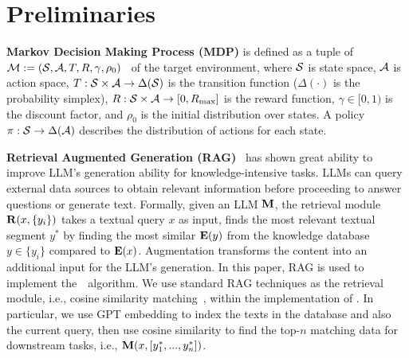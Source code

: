 
\vspace{-1mm}
\section{Preliminaries}
\vspace{-2mm}

\textbf{Markov Decision Making Process (MDP)} is defined as a tuple of ${\mathcal{M}}:=({\mathcal{S}}, {\mathcal{A}}, T, R, \gamma, \rho_0)$~\citep{rl@2018sutton} of the target environment, where ${\mathcal{S}}$ is state space, ${\mathcal{A}}$ is action space, $T:{\mathcal{S}}\times {\mathcal{A}}\to \Delta({\mathcal{S}})$ is the transition function ($\Delta(\cdot)$ is the probability simplex), $R:{\mathcal{S}}\times {\mathcal{A}}\to [0, R_{\max} ]$ is the reward function, $\gamma\in [0,1)$ is the discount factor, and $\rho_0$ is the initial distribution over states. A policy $\pi:{\mathcal{S}}\to \Delta({\mathcal{A}})$ describes the distribution of actions for each state. 

\textbf{Retrieval Augmented Generation (RAG)}~\citep{rag@2020patick} has shown great ability to improve LLM's generation ability for knowledge-intensive tasks. LLMs can query external data sources to obtain relevant information before proceeding to answer questions or generate text. Formally, given an LLM $\mathbf{M}$, the retrieval module $\mathbf{R}(x, \{y_i\})$ takes a textual query $x$ as input, finds the most relevant textual segment $y^*$ by finding the most similar $\mathbf{E}(y)$ from the knowledge database $y \in \{y_i\}$ compared to $\mathbf{E}(x)$. Augmentation transforms the content into an additional input for the LLM's generation. 
In this paper, RAG is used to implement the~\algo~algorithm. We use standard RAG techniques as the retrieval module, i.e., cosine similarity matching~\citep{colbert@2022khattab, kamalloo2023evaluating}, within the implementation of \algo. In particular, we use GPT embedding to index the texts in the database and also the current query, then use cosine similarity to find the top-$n$ matching data for downstream tasks, i.e., $\mathbf{M}(x,[y^*_1, ..., y^*_{n}])$.



